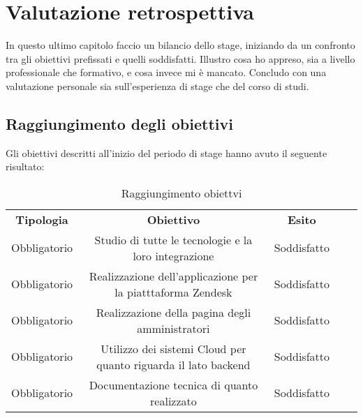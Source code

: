 
\chapter{Valutazione retrospettiva
}
\label{cap:conclusioni}
In questo ultimo capitolo faccio un bilancio dello stage, iniziando da un confronto tra
gli obiettivi prefissati e quelli soddisfatti.
Illustro cosa ho appreso, sia a livello professionale che formativo, e cosa invece mi è
mancato.
Concludo con una valutazione personale sia sull’esperienza di stage che del corso di
studi.
\section{Raggiungimento degli obiettivi}
Gli obiettivi descritti all'inizio del periodo di stage hanno avuto il seguente risultato:
\begin{center}
	\begin{table}[h]
		\centering
		\begin{tabular}{|c|c|c|ll}
			\cline{1-3}
			\textbf{Tipologia}          & \textbf{Obiettivo} & \textbf{Esito} &  &  \\ \cline{1-3}
			Obbligatorio       & Studio di tutte le tecnologie e la loro integrazione                   & Soddisfatto                   &  &  \\
			\cline{1-3}
			Obbligatorio&  Realizzazione dell'applicazione per la piatttaforma Zendesk                   & Soddisfatto                    &  &  \\
			\cline{1-3}
		Obbligatorio & Realizzazione della pagina degli amministratori                    & Soddisfatto                     &  &  \\ \cline{1-3}
			Obbligatorio   & Utilizzo dei sistemi Cloud per quanto riguarda il lato backend                   & Soddisfatto                    &  &  \\ \cline{1-3}
			Obbligatorio   & Documentazione tecnica di quanto realizzato                   & Soddisfatto                    &  &  \\ \cline{1-3}
		\end{tabular}
	\caption{Raggiungimento obiettvi}
	\end{table}
	\label{tab:Soddisfacimento Requisiti}

\end{center}
